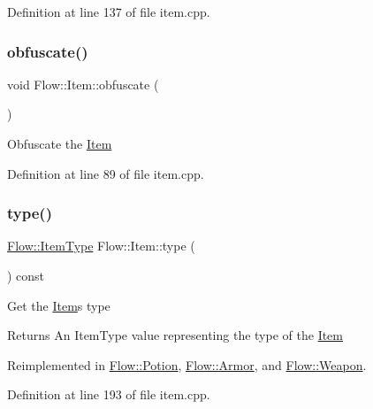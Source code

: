 Definition at line 137 of file item.\+cpp.

\hypertarget{class_flow_1_1_item_a75302c9fecaeef01b9dabde3a0861f8c}{}\label{class_flow_1_1_item_a75302c9fecaeef01b9dabde3a0861f8c} 
\subsubsection{\texorpdfstring{obfuscate()}{obfuscate()}}
{\footnotesize\ttfamily void Flow\+::\+Item\+::obfuscate (\begin{DoxyParamCaption}{ }\end{DoxyParamCaption})}

Obfuscate the \hyperlink{class_flow_1_1_item}{Item} 

Definition at line 89 of file item.\+cpp.

\hypertarget{class_flow_1_1_item_ae0c7ea7506ef62f2204837131f021f55}{}\label{class_flow_1_1_item_ae0c7ea7506ef62f2204837131f021f55} 
\subsubsection{\texorpdfstring{type()}{type()}}
{\footnotesize\ttfamily \hyperlink{namespace_flow_a09368c0b65b3d1bc5c227ed1046c8bca}{Flow\+::\+Item\+Type} Flow\+::\+Item\+::type (\begin{DoxyParamCaption}{ }\end{DoxyParamCaption}) const\hspace{0.3cm}{\ttfamily [virtual]}}

Get the \hyperlink{class_flow_1_1_item}{Item}\textquotesingle{}s type \begin{DoxyReturn}{Returns}
An Item\+Type value representing the type of the \hyperlink{class_flow_1_1_item}{Item} 
\end{DoxyReturn}


Reimplemented in \hyperlink{class_flow_1_1_potion_a5594ca2469cc324d4fc163cc96955d42}{Flow\+::\+Potion}, \hyperlink{class_flow_1_1_armor_af1c230e1f7f497caf6bcb86ccf67329d}{Flow\+::\+Armor}, and \hyperlink{class_flow_1_1_weapon_afa86ebc4b8803a970425c947f96e7c94}{Flow\+::\+Weapon}.



Definition at line 193 of file item.\+cpp.

\hypertarget{class_flow_1_1_item_afe1b907ce55b03b7011a694aedf1f1f9}{}\label{class_flow_1_1_item_afe1b907ce55b03b7011a694aedf1f1f9} 
